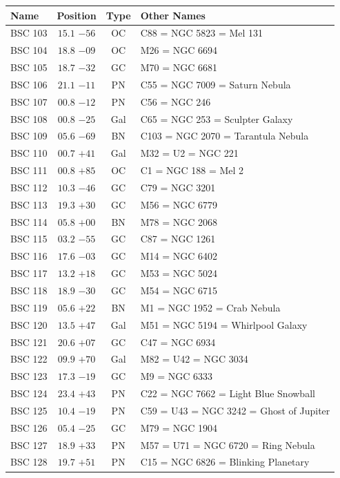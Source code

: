 \begin{table}[t]
    \setlength{\tabcolsep}{2pt}
    \footnotesize
    \begin{tabularx}{\linewidth}{lccX}
        \hline
        Name&Position&Type&Other Names\\
        \hline

BSC 103 &$15.1$ $-56$&OC &C88 = NGC 5823 = Mel 131\\
BSC 104 &$18.8$ $-09$&OC &M26 = NGC 6694\\
BSC 105 &$18.7$ $-32$&GC &M70 = NGC 6681\\
BSC 106 &$21.1$ $-11$&PN &C55 = NGC 7009 = Saturn Nebula\\
BSC 107 &$00.8$ $-12$&PN &C56 = NGC 246\\
BSC 108 &$00.8$ $-25$&Gal&C65 = NGC 253 = Sculpter Galaxy\\
BSC 109 &$05.6$ $-69$&BN &C103 = NGC 2070 = Tarantula Nebula\\
BSC 110 &$00.7$ $+41$&Gal&M32 = U2 = NGC 221\\
BSC 111 &$00.8$ $+85$&OC &C1 = NGC 188 = Mel 2\\
BSC 112 &$10.3$ $-46$&GC &C79 = NGC 3201\\
BSC 113 &$19.3$ $+30$&GC &M56 = NGC 6779\\
BSC 114 &$05.8$ $+00$&BN &M78 = NGC 2068\\
BSC 115 &$03.2$ $-55$&GC &C87 = NGC 1261\\
BSC 116 &$17.6$ $-03$&GC &M14 = NGC 6402\\
BSC 117 &$13.2$ $+18$&GC &M53 = NGC 5024\\
BSC 118 &$18.9$ $-30$&GC &M54 = NGC 6715\\
BSC 119 &$05.6$ $+22$&BN &M1 = NGC 1952 = Crab Nebula\\
BSC 120 &$13.5$ $+47$&Gal&M51 = NGC 5194 = Whirlpool Galaxy\\
BSC 121 &$20.6$ $+07$&GC &C47 = NGC 6934\\
BSC 122 &$09.9$ $+70$&Gal&M82 = U42 = NGC 3034\\
BSC 123 &$17.3$ $-19$&GC &M9 = NGC 6333\\
BSC 124 &$23.4$ $+43$&PN &C22 = NGC 7662 = Light Blue Snowball\\
BSC 125 &$10.4$ $-19$&PN &C59 = U43 = NGC 3242 = Ghost of Jupiter\\
BSC 126 &$05.4$ $-25$&GC &M79 = NGC 1904\\
BSC 127 &$18.9$ $+33$&PN &M57 = U71 = NGC 6720 = Ring Nebula\\
BSC 128 &$19.7$ $+51$&PN &C15 = NGC 6826 = Blinking Planetary\\

\end{tabularx}
\end{table}
